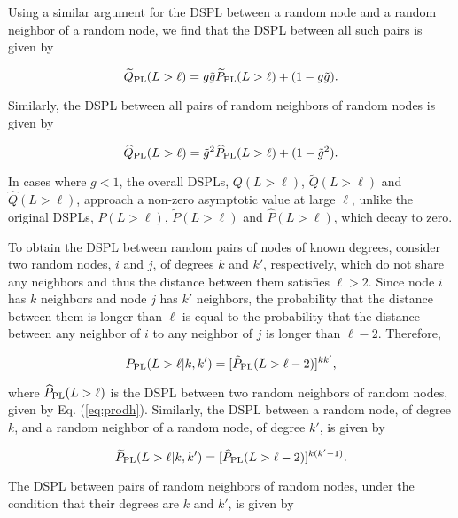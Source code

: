 \documentclass[preprint,pre,superscriptaddress,showpacs]{revtex4}
\begin{document}
\noindent
Using a similar argument for the DSPL between a random node
and a random neighbor of a random node, we find that the
DSPL between all such pairs is given by

\begin{equation}
\widetilde Q_{\rm PL}(L>\ell) = g {\tilde g} \widetilde P_{\rm PL}(L>\ell) + (1 - g \tilde g).
\label{eq:Qt}
\end{equation}

\noindent
Similarly, the DSPL between all pairs of 
random neighbors of random nodes is given by

\begin{equation}
\widehat Q_{\rm PL}(L>\ell) =  {\tilde g}^2 \widehat P_{\rm PL}(L>\ell) + (1 -  {\tilde g}^2).
\label{eq:Qw}
\end{equation}

\noindent
In cases where $g<1$, the overall DSPLs,
$Q(L>\ell)$, $\widetilde Q(L>\ell)$ and $\widehat Q(L>\ell)$,
approach a non-zero asymptotic
value at large $\ell$, unlike the original DSPLs, 
$P(L>\ell)$, $\widetilde P(L>\ell)$ and $\widehat P(L>\ell)$,
which decay to zero.

To obtain the DSPL between random pairs of nodes of known degrees,
consider two random nodes, $i$ and $j$, of degrees $k$ and $k'$, respectively,
which do not share any neighbors and thus the distance between them
satisfies $\ell > 2$.
Since node $i$ has $k$ neighbors and node $j$ has $k'$ neighbors, the probability
that the distance between them is longer than $\ell$
is equal to the probability that
the distance between any neighbor of $i$ to 
any neighbor of $j$ is longer than
$\ell-2$. 
Therefore,

\begin{equation}
P_{\rm PL}(L > \ell | k,k') = [ \widehat P_{\rm PL}(L>\ell-2)]^{k k'},
\label{eq:P}
\end{equation}

\noindent
where $\widehat P_{\rm PL}(L>\ell)$ is 
the DSPL between two random neighbors of random nodes,
given by
Eq. (\ref{eq:prodh}).
Similarly, the DSPL between a random node, of degree $k$, and a random 
neighbor of a random node,
of degree $k'$, is given by

\begin{equation}
\widetilde P_{\rm PL}(L > \ell |  k,k') = [ \widehat P_{\rm PL}(L>\ell-2)]^{k(k'-1)}.
\label{eq:wtP}
\end{equation}

\noindent
The DSPL between pairs of random neighbors of random nodes, 
under the condition that their degrees are $k$ and $k'$,
is given by
\end{document}
